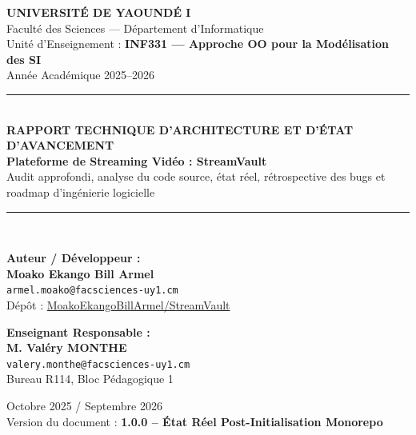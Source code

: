 \documentclass[11pt,a4paper]{article}
\begin{document}
\begin{titlepage}
    \centering
    \vspace*{1cm}
    
    {\Large \textbf{UNIVERSITÉ DE YAOUNDÉ I}}\\[0.2cm]
    {\large Faculté des Sciences — Département d'Informatique}\\[0.2cm]
    {\small Unité d'Enseignement : \textbf{INF331 — Approche OO pour la Modélisation des SI}}\\[0.1cm]
    {\small Année Académique 2025--2026}\\[1.5cm]
    
    \rule{\linewidth}{1.5pt}\\[0.4cm]
    {\huge \bfseries RAPPORT TECHNIQUE D'ARCHITECTURE ET D'ÉTAT D'AVANCEMENT}\\[0.3cm]
    {\LARGE \textcolor{primaryBlue}{\textbf{Plateforme de Streaming Vidéo : StreamVault}}}\\[0.1cm]
    {\large Audit approfondi, analyse du code source, état réel, rétrospective des bugs et roadmap d'ingénierie logicielle}
    \rule{\linewidth}{1.5pt}\\[2.5cm]
    
    \begin{minipage}{0.48\textwidth}
        \textbf{Auteur / Développeur :} \\[0.2cm]
        \textbf{Moako Ekango Bill Armel} \\
        \texttt{armel.moako@facsciences-uy1.cm} \\
        Dépôt : \href{https://github.com/MoakoEkangoBillArmel/StreamVault}{MoakoEkangoBillArmel/StreamVault}
    \end{minipage}
    \hfill
    \begin{minipage}{0.48\textwidth}
        \begin{flushright}
            \textbf{Enseignant Responsable :} \\[0.2cm]
            \textbf{M. Valéry MONTHE} \\
            \texttt{valery.monthe@facsciences-uy1.cm} \\
            Bureau R114, Bloc Pédagogique 1
        \end{flushright}
    \end{minipage}
    
    \vfill
    
    {\large Octobre 2025 / Septembre 2026}\\[0.3cm]
    {\small Version du document : \textbf{1.0.0 -- État Réel Post-Initialisation Monorepo}}
\end{titlepage}
\end{document}
